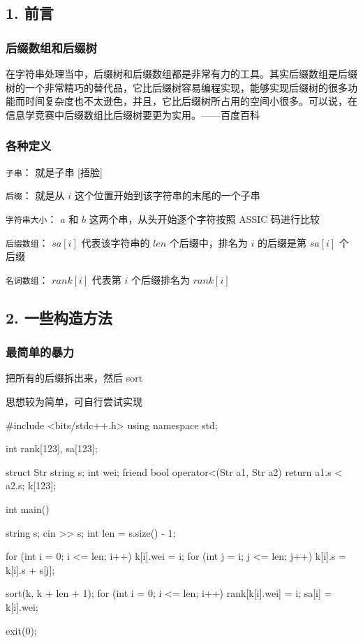 
\subsection{1. 前言}

\subsubsection{后缀数组和后缀树}

\begin{QUOTE}{}{}
在字符串处理当中，后缀树和后缀数组都是非常有力的工具。其实后缀数组是后缀树的一个非常精巧的替代品，它比后缀树容易编程实现，能够实现后缀树的很多功能而时间复杂度也不太逊色，并且，它比后缀树所占用的空间小很多。可以说，在信息学竞赛中后缀数组比后缀树要更为实用。——百度百科
\end{QUOTE}

\subsubsection{各种定义}

\texttt{子串}： 就是子串 [捂脸]

\texttt{后缀}： 就是从 $i$ 这个位置开始到该字符串的末尾的一个子串

\texttt{字符串大小}： $a$ 和 $b$ 这两个串，从头开始逐个字符按照 ASSIC 码进行比较

\texttt{后缀数组}： $sa[i]$ 代表该字符串的 $len$ 个后缀中，排名为 $i$ 的后缀是第 $sa[i]$ 个后缀

\texttt{名词数组}： $rank[i]$ 代表第 $i$ 个后缀排名为 $rank[i]$

\subsection{2. 一些构造方法}

\subsubsection{最简单的暴力}

把所有的后缀拆出来，然后 sort

思想较为简单，可自行尝试实现

\begin{cppcode}
#include <bits/stdc++.h>
using namespace std;

int rank[123], sa[123];

struct Str {
  string s;
  int wei;
  friend bool operator<(Str a1, Str a2) { return a1.s < a2.s; }
} k[123];

int main() {
  string s;
  cin >> s;
  int len = s.size() - 1;

  for (int i = 0; i <= len; i++) {
    k[i].wei = i;
    for (int j = i; j <= len; j++) k[i].s = k[i].s + s[j];
  }

  sort(k, k + len + 1);
  for (int i = 0; i <= len; i++) {
    rank[k[i].wei] = i;
    sa[i] = k[i].wei;
  }

  exit(0);
}
\end{cppcode}

